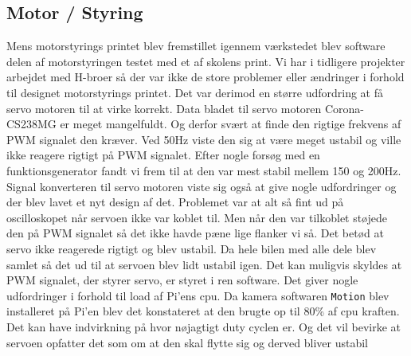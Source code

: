 \subsection{Motor / Styring}
Mens motorstyrings printet blev fremstillet igennem værkstedet blev software delen af motorstyringen testet med et af skolens print. Vi har i tidligere projekter arbejdet med H-broer så der var ikke de store problemer eller ændringer i forhold til designet motorstyrings printet.\newline
Det var derimod en større udfordring at få servo motoren til at virke korrekt.  
Data bladet til servo motoren Corona-CS238MG \cite{lib:Corona-CS238MG} er meget mangelfuldt. Og derfor svært at finde den rigtige frekvens af PWM signalet den kræver. 
Ved 50Hz viste den sig at være meget ustabil og ville ikke reagere rigtigt på PWM signalet. 
Efter nogle forsøg med en funktionsgenerator fandt vi frem til at den var mest stabil mellem 150 og 200Hz. 
Signal konverteren til servo motoren viste sig også at give nogle udfordringer og der blev lavet et nyt design af det.
Problemet var at alt så fint ud på oscilloskopet når servoen ikke var koblet til. 
Men når den var tilkoblet støjede den på PWM signalet så det ikke havde pæne lige flanker vi så. 
Det betød at servo ikke reagerede rigtigt og blev ustabil.
Da hele bilen med alle dele blev samlet så det ud til at servoen blev lidt ustabil igen. Det kan muligvis skyldes at PWM signalet, der styrer servo, er styret i ren software. 
Det giver nogle udfordringer i forhold til load af Pi'ens cpu. Da kamera softwaren \texttt{Motion} blev installeret på Pi'en blev det konstateret at den brugte op til 80\% af cpu kraften. Det kan have indvirkning på hvor nøjagtigt duty cyclen er. Og det vil bevirke at servoen opfatter det som om at den skal flytte sig og derved bliver ustabil